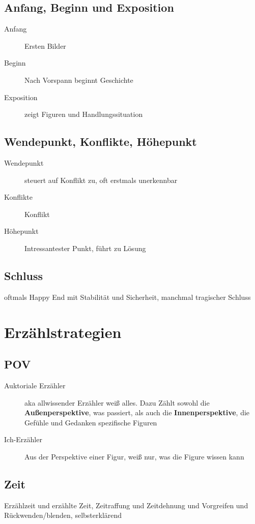 \documentclass{article}
\begin{document}
\subsection{Anfang, Beginn und Exposition}  
\begin{description}
\item[Anfang] Ersten Bilder
\item[Beginn] Nach Vorspann beginnt Geschichte
\item[Exposition] zeigt Figuren und Handlungssituation 
\end{description} 
 
\subsection{Wendepunkt, Konflikte, Höhepunkt}  
\begin{description}
\item[Wendepunkt] steuert auf Konflikt zu, oft erstmals unerkennbar
\item[Konflikte] Konflikt
\item[Höhepunkt] Intressantester Punkt, führt zu Lösung
\end{description} 
 
\subsection{Schluss}  
oftmals Happy End mit Stabilität und Sicherheit, manchmal tragischer Schluss
 
\section{Erzählstrategien} 
\subsection{POV}
\begin{description}
\item[Auktoriale Erzähler] aka allwissender Erzähler weiß alles. Dazu Zählt sowohl die \textbf{Außenperspektive}, was passiert, als auch die \textbf{Innenperspektive}, die Gefühle und Gedanken spezifische Figuren
\item[Ich-Erzähler] Aus der Perspektive einer Figur, weiß nur, was die Figure wissen kann
\end{description}
 
\subsection{Zeit}
Erzählzeit und erzählte Zeit, Zeitraffung und Zeitdehnung und Vorgreifen und Rückwenden/blenden, selbsterklärend
 
\end{document}
